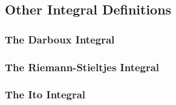 



\subsection{Other Integral Definitions} 

\subsubsection{The Darboux Integral}







\subsubsection{The Riemann-Stieltjes Integral}



\subsubsection{The Ito Integral}




